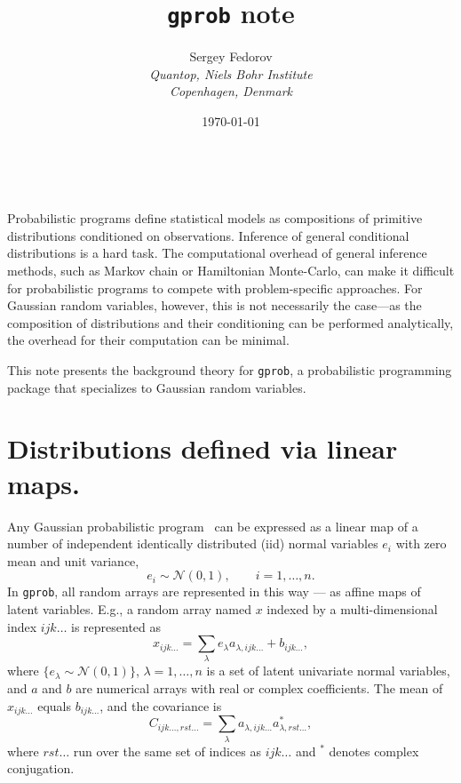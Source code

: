 \documentclass[a4paper,notitlepage]{article}
\makeatletter
\renewcommand{\maketitle}{\bgroup\setlength{\parindent}{0pt}
	\begin{center}
		\LARGE{\@title}
	\end{center}	
	\begin{flushright}
		\small{\@author}\\
		\small{\@date}
	\end{flushright}\egroup
}
\makeatother
\begin{document}
\title{\texttt{gprob} note}
\author{
Sergey Fedorov\\
\emph{Quantop, Niels Bohr Institute \\Copenhagen, Denmark}}
\date{\today}
\maketitle

Probabilistic programs define statistical models as compositions of primitive distributions conditioned on observations.
Inference of general conditional distributions is a hard task. 
The computational overhead of general inference methods, such as Markov chain or Hamiltonian Monte-Carlo, can make it difficult for probabilistic programs to compete with problem-specific approaches. 
For Gaussian random variables, however, this is not necessarily the case---as the composition of distributions and their conditioning can be performed analytically, the overhead for their computation can be minimal.


This note presents the background theory for \texttt{gprob}, a probabilistic programming package that specializes to Gaussian random variables. 


\section{Distributions defined via linear maps.}

Any Gaussian probabilistic program~\cite{stein_compositional_2021} can be expressed as a linear map of a number of independent identically distributed (iid) normal variables $e_i$ with zero mean and unit variance,
\begin{equation}
e_i \sim \mathcal{N}(0,1),\qquad i=1,\ldots,n.
\end{equation} 
In \texttt{gprob}, all random arrays are represented in this way --- as affine maps of latent variables. E.g., a random array named $x$ indexed by a multi-dimensional index $ijk\ldots$ is represented as
\begin{equation}
x_{ijk\ldots}=\sum_\lambda e_\lambda a_{\lambda, ijk\ldots}+b_{ijk\ldots},
\end{equation}
where $\{e_\lambda\sim \mathcal{N}(0,1)\}$, $\lambda = 1,\ldots,n$ is a set of latent univariate normal variables, and $a$ and $b$ are numerical arrays with real or complex coefficients. The mean of $x_{ijk\ldots}$ equals $b_{ijk\ldots}$, and the covariance is
\begin{equation}
C_{ijk\ldots,rst\ldots}=\sum_{\lambda} a_{\lambda, ijk\ldots} a^*_{\lambda, rst\ldots},
\end{equation}
where $rst\ldots$ run over the same set of indices as $ijk\ldots$ and $^*$ denotes complex conjugation.
\end{document}
